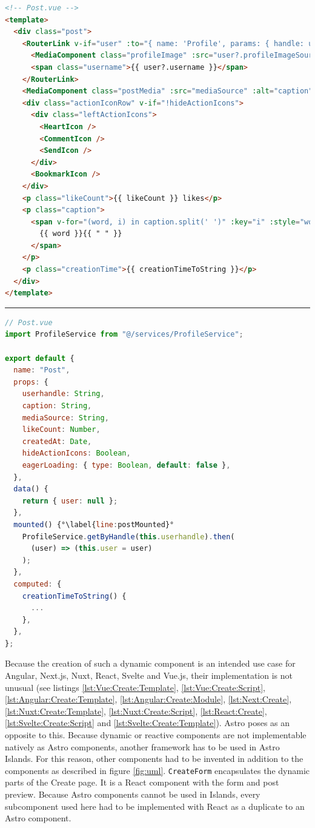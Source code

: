 \documentclass[a4paper, 12pt]{article}
\begin{document}
\vspace{1cm}
\begin{lstlisting}[caption=Post in Vue.js (Template), label={lst:Vue:Post:Template}, language=HTML]
<!-- Post.vue -->
<template>
  <div class="post">
    <RouterLink v-if="user" :to="{ name: 'Profile', params: { handle: userhandle } }" class="postUserInfo" >
      <MediaComponent class="profileImage" :src="user?.profileImageSource" alt="" width="44" height="44" />
      <span class="username">{{ user?.username }}</span>
    </RouterLink>
    <MediaComponent class="postMedia" :src="mediaSource" :alt="caption" width="100%" height="100%" :eagerLoading="eagerLoading" />
    <div class="actionIconRow" v-if="!hideActionIcons">
      <div class="leftActionIcons">
        <HeartIcon />
        <CommentIcon />
        <SendIcon />
      </div>
      <BookmarkIcon />
    </div>
    <p class="likeCount">{{ likeCount }} likes</p>
    <p class="caption">
      <span v-for="(word, i) in caption.split(' ')" :key="i" :style="word.startsWith('#') ? 'color: #0091E2' : ''">
        {{ word }}{{ " " }}
      </span>
    </p>
    <p class="creationTime">{{ creationTimeToString }}</p>
  </div>
</template>
\end{lstlisting}
\hrule
\begin{lstlisting}[caption=Post in Vue.js (Script), label={lst:Vue:Post:Script}, language=JavaScript, firstnumber=26, escapechar=°]
// Post.vue
import ProfileService from "@/services/ProfileService";

export default {
  name: "Post",
  props: {
    userhandle: String,
    caption: String,
    mediaSource: String,
    likeCount: Number,
    createdAt: Date,
    hideActionIcons: Boolean,
    eagerLoading: { type: Boolean, default: false },
  },
  data() {
    return { user: null };
  },
  mounted() {°\label{line:postMounted}°
    ProfileService.getByHandle(this.userhandle).then(
      (user) => (this.user = user)
    );
  },
  computed: {
    creationTimeToString() {
      ...
    },
  },
};
\end{lstlisting}
\vspace{1cm}

Because the creation of such a dynamic component is an intended use case for Angular, Next.js, Nuxt, React, Svelte and Vue.js, their implementation is not unusual (see listings \ref{lst:Vue:Create:Template}, \ref{lst:Vue:Create:Script}, \ref{lst:Angular:Create:Template}, \ref{lst:Angular:Create:Module}, \ref{lst:Next:Create}, \ref{lst:Nuxt:Create:Template}, \ref{lst:Nuxt:Create:Script}, \ref{lst:React:Create}, \ref{lst:Svelte:Create:Script} and \ref{lst:Svelte:Create:Template}).
Astro poses as an opposite to this.
Because dynamic or reactive components are not implementable natively as Astro components, another framework has to be used in Astro Islands.
For this reason, other components had to be invented in addition to the components as described in figure \ref{fig:uml}.
\verb|CreateForm| encapsulates the dynamic parts of the Create page.
It is a React component with the form and post preview.
Because Astro components cannot be used in Islands, every subcomponent used here had to be implemented with React as a duplicate to an Astro component.
\end{document}
